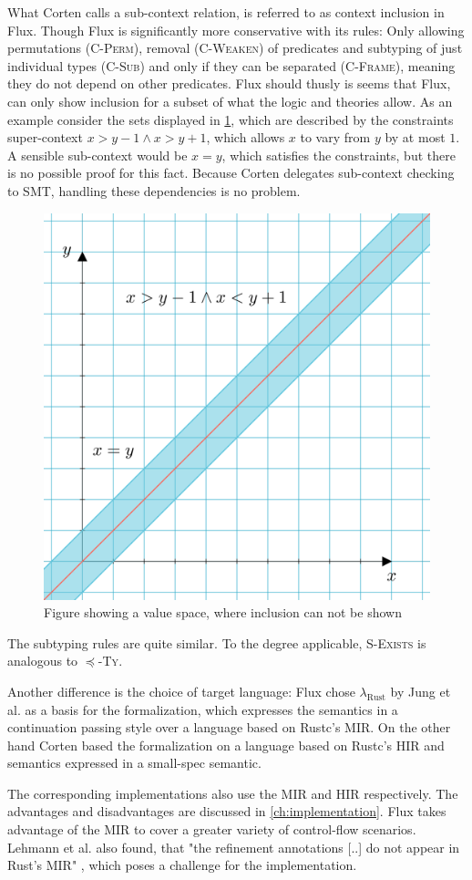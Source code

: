 \documentclass[twoside, english]{sdqthesis}
\theoremstyle{definition}
\begin{document}
What Corten calls a sub-context relation, is referred to as context inclusion in Flux.
Though Flux is significantly more conservative with its rules: Only allowing permutations (\textsc{C-Perm}), removal (\textsc{C-Weaken}) of predicates and subtyping of just individual types (\textsc{C-Sub}) and only if they can be separated (\textsc{C-Frame}), meaning they do not depend on other predicates.
Flux should thusly is seems that Flux, can only show inclusion for a subset of what the logic and theories allow.
As an example consider the sets displayed in \cref{fig:flux-context-space}, which are described by the constraints super-context $x > y - 1 \wedge x > y + 1$, which allows $x$ to vary from $y$ by at most $1$. A sensible sub-context would be $x=y$, which satisfies the constraints, but there is no possible proof for this fact.
Because Corten delegates sub-context checking to SMT, handling these dependencies is no problem.

\begin{figure}[h]
	\centering
	\includegraphics[width=0.5\linewidth]{../context-space.png}
	\caption{Figure showing a value space, where inclusion can not be shown}
	\label{fig:flux-context-space}
\end{figure}

The subtyping rules are quite similar. To the degree applicable, \textsc{S-Exists} is analogous to \textsc{$\preceq$-Ty}.

Another difference is the choice of target language: Flux chose $\lambda_{\text{Rust}}$ by Jung et al. \cite{jung_rustbelt_2018} as a basis for the formalization, which expresses the semantics in a continuation passing style over a language based on Rustc's MIR. 
On the other hand Corten based the formalization on a language based on Rustc's HIR and semantics expressed in a small-spec semantic. 

The corresponding implementations also use the MIR and HIR respectively. The advantages and disadvantages are discussed in \cref{ch:implementation}. Flux takes advantage of the MIR to cover a greater variety of control-flow scenarios.
Lehmann et al. also found, that "the refinement annotations [..] do not appear in Rust's MIR" \cite[p. 17]{lehmann_flux_2022}, which poses a challenge for the implementation.
\end{document}

